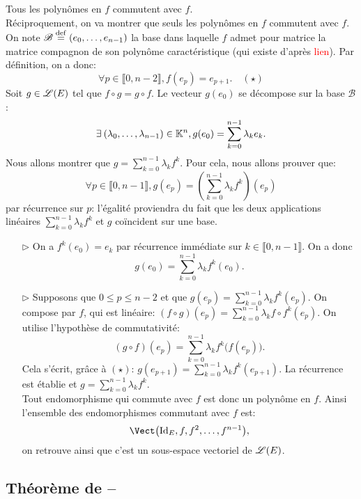 \begin{demo}
    Tous les polynômes en $f$ commutent avec $f$. \\
    Réciproquement, on va montrer que seuls les polynômes en $f$ commutent avec $f$. On note $\mathscr{B} \overset{\mathrm{\tiny def}}{=} (e_0, \dots, e_{n-1})$ la base dans laquelle $f$ admet pour matrice la matrice compagnon de son polynôme caractéristique (qui existe d'après \textcolor{red}{lien}). Par définition, on a donc:
    $$\forall p \in \llbracket 0, n-2 \rrbracket, f(e_p) = e_{p+1}. \quad (\star)$$
    Soit $g \in \mathscr{L}(E)$ tel que $f \circ g = g \circ f$. Le vecteur $g(e_0)$ se décompose sur la base $\mathscr{B}$:
    $$\exists (\lambda_0, \dots, \lambda_{n-1}) \in \K^n, g(e_0) = \sum_{k=0}^{n-1} \lambda_k e_k.$$
    Nous allons montrer que $g = \sum\limits_{k=0}^{n-1} \lambda_k f^k$. Pour cela, nous allons prouver que:
    $$\forall p \in \llbracket 0, n-1 \rrbracket, g(e_p) = \left( \sum_{k=0}^{n-1} \lambda_k f^k \right)(e_p)$$
    par récurrence sur $p$: l'égalité proviendra du fait que les deux applications linéaires $\sum\limits_{k=0}^{n-1} \lambda_k f^k$ et $g$ coïncident sur une base. 
    \begin{itemize}
        \item[$\rhd$] On a $f^k (e_0) = e_k$ par récurrence immédiate sur $k \in \llbracket 0, n-1 \rrbracket$. On a donc
        $$g(e_0) = \sum_{k=0}^{n-1} \lambda_k f^k(e_0).$$
        \item[$\rhd$] Supposons que $0 \leqslant p \leqslant n-2$ et que $g(e_p) = \sum\limits_{k=0}^{n-1} \lambda_k f^k (e_p)$. On compose par $f$, qui est linéaire: $(f \circ g)(e_p) = \sum\limits_{k=0}^{n-1} \lambda_k f \circ f^k (e_p)$. On utilise l'hypothèse de commutativité:
        $$(g \circ f)(e_p) = \sum_{k=0}^{n-1} \lambda_k f^k \big( f(e_p) \big).$$
        Cela s'écrit, grâce à $(\star)$: $g(e_{p+1}) = \sum\limits_{k=0}^{n-1} \lambda_k f^k(e_{p+1})$. La récurrence est établie et $g = \sum\limits_{k=0}^{n-1} \lambda_k f^k$. \\
        Tout endomorphisme qui commute avec $f$ est donc un polynôme en $f$. Ainsi l'ensemble des endomorphismes commutant avec $f$ est:
        $$\Vect \big( \Id_E, f, f^2, \dots, f^{n-1}\big),$$
        on retrouve ainsi que c'est un sous-espace vectoriel de $\mathscr{L}(E)$.
    \end{itemize}
\end{demo}

\subsection{Théorème de --}

